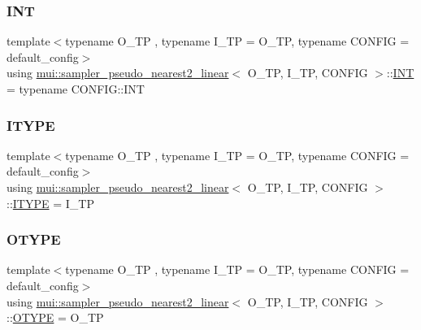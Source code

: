 \subsubsection{\texorpdfstring{I\+NT}{INT}}
{\footnotesize\ttfamily template$<$typename O\+\_\+\+TP , typename I\+\_\+\+TP  = O\+\_\+\+TP, typename C\+O\+N\+F\+IG  = default\+\_\+config$>$ \\
using \hyperlink{classmui_1_1sampler__pseudo__nearest2__linear}{mui\+::sampler\+\_\+pseudo\+\_\+nearest2\+\_\+linear}$<$ O\+\_\+\+TP, I\+\_\+\+TP, C\+O\+N\+F\+IG $>$\+::\hyperlink{classmui_1_1sampler__pseudo__nearest2__linear_a0c56f2dcb173523bfdb33fc9a271c767}{I\+NT} =  typename C\+O\+N\+F\+I\+G\+::\+I\+NT}

\mbox{\label{classmui_1_1sampler__pseudo__nearest2__linear_a1ab1a956844436db5763df87746f4090}} 
\subsubsection{\texorpdfstring{I\+T\+Y\+PE}{ITYPE}}
{\footnotesize\ttfamily template$<$typename O\+\_\+\+TP , typename I\+\_\+\+TP  = O\+\_\+\+TP, typename C\+O\+N\+F\+IG  = default\+\_\+config$>$ \\
using \hyperlink{classmui_1_1sampler__pseudo__nearest2__linear}{mui\+::sampler\+\_\+pseudo\+\_\+nearest2\+\_\+linear}$<$ O\+\_\+\+TP, I\+\_\+\+TP, C\+O\+N\+F\+IG $>$\+::\hyperlink{classmui_1_1sampler__pseudo__nearest2__linear_a1ab1a956844436db5763df87746f4090}{I\+T\+Y\+PE} =  I\+\_\+\+TP}

\mbox{\label{classmui_1_1sampler__pseudo__nearest2__linear_a3c1ae43f20045121e8c84d1f7116cf67}} 
\subsubsection{\texorpdfstring{O\+T\+Y\+PE}{OTYPE}}
{\footnotesize\ttfamily template$<$typename O\+\_\+\+TP , typename I\+\_\+\+TP  = O\+\_\+\+TP, typename C\+O\+N\+F\+IG  = default\+\_\+config$>$ \\
using \hyperlink{classmui_1_1sampler__pseudo__nearest2__linear}{mui\+::sampler\+\_\+pseudo\+\_\+nearest2\+\_\+linear}$<$ O\+\_\+\+TP, I\+\_\+\+TP, C\+O\+N\+F\+IG $>$\+::\hyperlink{classmui_1_1sampler__pseudo__nearest2__linear_a3c1ae43f20045121e8c84d1f7116cf67}{O\+T\+Y\+PE} =  O\+\_\+\+TP}

